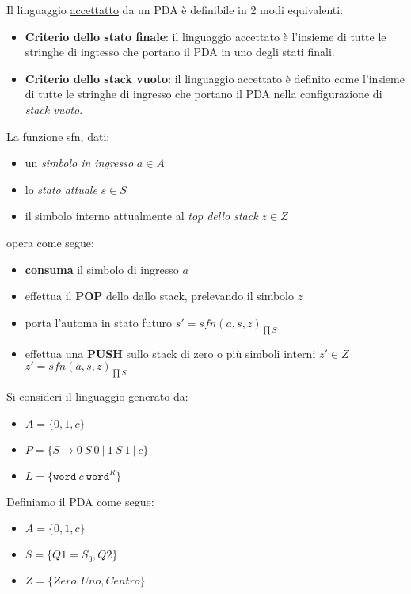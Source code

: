 Il linguaggio \underline{accettatto} da un PDA è definibile in 2 modi equivalenti:
\begin{itemize}
    \item \textbf{Criterio dello stato finale}: il linguaggio accettato è l'insieme di tutte le stringhe di ingtesso che portano il PDA in uno degli stati finali.
    \item \textbf{Criterio dello stack vuoto}: il linguaggio accettato è definito come l'insieme di tutte le stringhe di ingresso che portano il PDA nella configurazione di \textit{stack vuoto}.
\end{itemize}

La funzione sfn, dati:
\begin{itemize}
    \item un \textit{simbolo in ingresso} $a\in A$
    \item lo \textit{stato attuale} $s\in S$
    \item il simbolo interno attualmente al \textit{top dello stack} $z\in Z$
\end{itemize}
opera come segue:
\begin{itemize}
    \item \textbf{consuma} il simbolo di ingresso $a$
    \item effettua il \textbf{POP} dello dallo stack, prelevando il simbolo $z$
    \item porta l'automa in stato futuro $s' = sfn(a, s, z)_{\prod S}$
    \item effettua una \textbf{PUSH} sullo stack di zero o più simboli interni $z'\in Z$\\ $z' = sfn(a, s, z)_{\prod S}$
\end{itemize}

Si consideri il linguaggio generato da:
\begin{itemize}
    \item $A = \{0, 1, c\}$
    \item $P = \{S \rightarrow 0\ S\ 0\ |\ 1\ S\ 1\ |\ c\}$
    \item $L = \{\texttt{word}\  c\ \texttt{word}^R\}$
\end{itemize}

Definiamo il PDA come segue:
\begin{itemize}
    \item $A = \{0, 1, c\}$
    \item $S = \{Q1=S_0, Q2\}$
    \item $Z = \{Zero, Uno, Centro\}$
\end{itemize}

